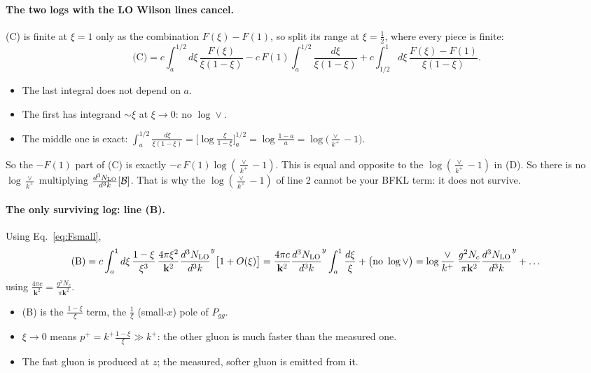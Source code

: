 \documentclass[10pt]{article}
\numberwithin{equation}{section}
\newcommand{\NLO}[1]{\frac{d^3N_{#1}}{d^3k}}
\begin{document}
\paragraph{The two logs with the LO Wilson lines cancel.} (C) is finite at $\xi=1$ only as the combination $F(\xi)-F(1)$, so split its range at $\xi=\frac12$, where every piece is finite:
\begin{equation}
\text{(C)}=c\int_a^{1/2}d\xi\,\frac{F(\xi)}{\xi(1-\xi)}-c\,F(1)\int_a^{1/2}\frac{d\xi}{\xi(1-\xi)}+c\int_{1/2}^1d\xi\,\frac{F(\xi)-F(1)}{\xi(1-\xi)} .
\end{equation}
\begin{itemize}
\item The last integral does not depend on $a$.
\item The first has integrand $\sim\xi$ at $\xi\to0$: no $\log\vee$.
\item The middle one is exact: $\int_a^{1/2}\frac{d\xi}{\xi(1-\xi)}=\Big[\log\frac{\xi}{1-\xi}\Big]_a^{1/2}=\log\frac{1-a}{a}=\log\Big(\frac{\vee}{k^+}-1\Big)$.
\end{itemize}
So the $-F(1)$ part of (C) is exactly $-c\,F(1)\log(\frac{\vee}{k^+}-1)$. This is equal and opposite to the $\log(\frac{\vee}{k^+}-1)$ in (D). So there is no $\log\frac{\vee}{k^+}$ multiplying $\NLO{\rm LO}[\mathcal B]$. That is why the $\log(\frac{\vee}{k^+}-1)$ of line 2 cannot be your BFKL term: it does not survive.

\paragraph{The only surviving log: line (B).} Using Eq.~\eqref{eq:Fsmall},
\begin{equation}
\text{(B)}=c\int_a^1d\xi\,\frac{1-\xi}{\xi^3}\,\frac{4\pi\xi^2}{\mathbf k^2}\NLO{\rm LO}^{y}\big[1+O(\xi)\big]
=\frac{4\pi c}{\mathbf k^2}\NLO{\rm LO}^{y}\int_a^1\frac{d\xi}{\xi}+\big(\text{no }\log\vee\big)
=\log\frac{\vee}{k^+}\;\frac{g^2N_c}{\pi\mathbf k^2}\NLO{\rm LO}^{y}+\dots
\end{equation}
using $\frac{4\pi c}{\mathbf k^2}=\frac{g^2N_c}{\pi\mathbf k^2}$.
\begin{itemize}
\item (B) is the $\frac{1-\xi}{\xi}$ term, the $\frac{1}{\xi}$ (small-$x$) pole of $P_{gg}$.
\item $\xi\to0$ means $p^+=k^+\frac{1-\xi}{\xi}\gg k^+$: the other gluon is much faster than the measured one.
\item The fast gluon is produced at $z$; the measured, softer gluon is emitted from it.
\end{itemize}
\end{document}
